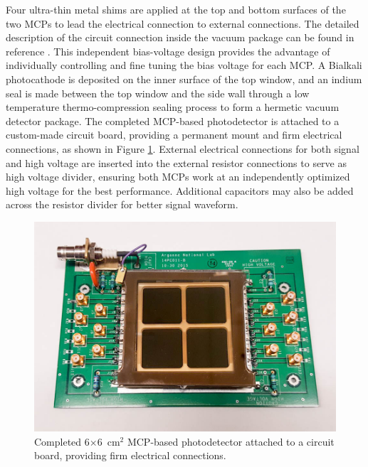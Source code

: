 \documentclass[preprint,5p]{elsarticle}
\begin{document}
Four ultra-thin metal shims are applied at the top and bottom surfaces of the 
two MCPs to lead the electrical connection to external connections. The 
detailed description of the circuit connection inside the vacuum package can be 
found in reference \cite{Xia-MCPs}. This independent bias-voltage design 
provides the advantage of individually controlling and fine tuning the bias 
voltage for each MCP. A Bialkali photocathode is deposited on the inner surface 
of the top window, and an indium seal is made between the top window and the 
side wall through a low temperature thermo-compression sealing process to form 
a hermetic vacuum detector package. The completed MCP-based photodetector is 
attached to a custom-made circuit board, providing a permanent mount and firm 
electrical connections, as shown in Figure \ref{fig:MCP_assm}. External 
electrical connections for both signal and high voltage are inserted into the 
external resistor connections to serve as high voltage divider, ensuring both 
MCPs work at an independently optimized high voltage for the best performance.  
Additional capacitors may also be added across the resistor divider for better 
signal waveform.  

\begin{figure}[tbp]
\centering 
\includegraphics[scale=0.23]{fig/MCPs_assembly.png}
\caption{Completed 6$\times$6~cm$^2$ MCP-based photodetector attached to a 
circuit board, providing firm electrical connections.} \label{fig:MCP_assm}
\end{figure}
\end{document}
